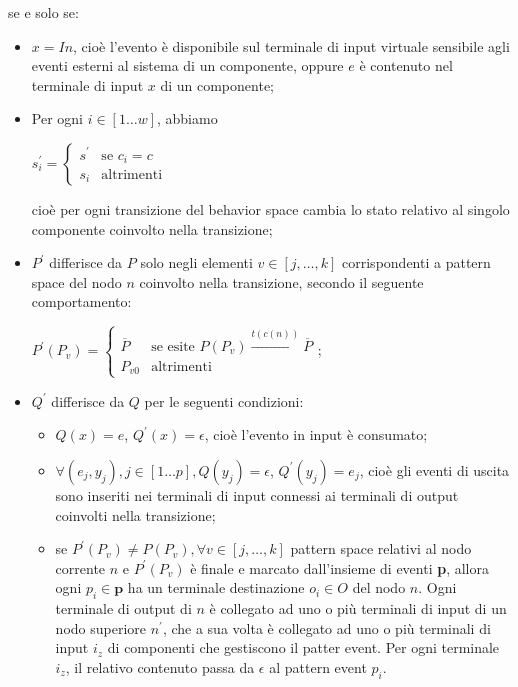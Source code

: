 \begin{defn}
\begin{enumerate}
se e solo se:
\begin{itemize}
\item $x = In$, cioè l'evento è disponibile sul terminale di input virtuale sensibile agli eventi esterni al sistema di un componente, oppure $e$ è contenuto nel terminale di input $x$ di un componente;
\item Per ogni $i \in [1 \ldots w]$, abbiamo
\begin{center}
$s^\prime_i = \begin{cases} s^\prime & \mbox{se }c_i = c\\ s_i & \mbox{altrimenti} \end{cases}$
\end{center}
cioè per ogni transizione del behavior space cambia lo stato relativo al singolo componente coinvolto nella transizione;
\item $P^\prime$ differisce da $P$ solo negli elementi $v \in [j, \ldots, k]$ corrispondenti a pattern space del nodo $n$ coinvolto nella transizione, secondo il seguente comportamento:
\begin{center}
$P^\prime(P_v) = \begin{cases} \overline{P} & \mbox{se esite } P(P_v) \xrightarrow{t(c(n))} \overline{P}\\ P_{v0} & \mbox{altrimenti} \end{cases}$;
\end{center}
\item $Q^\prime$ differisce da $Q$ per le seguenti condizioni:
\begin{itemize}
\item $Q(x) = e$, $Q^\prime(x) = \epsilon$, cioè l'evento in input è consumato;
\item $\forall(e_j,y_j), j \in [1 \ldots p], Q(y_j) = \epsilon$, $Q^\prime(y_j) = e_j$, cioè gli eventi di uscita sono inseriti nei terminali di input connessi ai terminali di output coinvolti nella transizione;
\item se $P^\prime(P_v) \neq P(P_v), \forall v \in [j, \ldots, k]$ pattern space relativi al nodo corrente $n$ e $P^\prime(P_v)$ è finale e marcato dall'insieme di eventi \textbf{p}, allora ogni $p_i \in \textbf{p}$  ha un terminale destinazione $o_i \in O$ del nodo $n$. Ogni terminale di output di $n$ è collegato ad uno o più terminali di input di un nodo superiore $n^\prime$, che a sua volta è collegato ad uno o più terminali di input $i_z$ di componenti che gestiscono il patter event. Per ogni terminale $i_z$, il relativo contenuto passa da $\epsilon$ al pattern event $p_i$.
\end{itemize}
\end{itemize}
\end{enumerate}
\end{defn}

